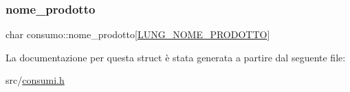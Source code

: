 \subsubsection{\texorpdfstring{nome\+\_\+prodotto}{nome\_prodotto}}
{\footnotesize\ttfamily char consumo\+::nome\+\_\+prodotto\mbox{[}\hyperlink{consumi_8h_aac906bc404d4143a882b5d18fe2e907e}{L\+U\+N\+G\+\_\+\+N\+O\+M\+E\+\_\+\+P\+R\+O\+D\+O\+T\+TO}\mbox{]}}



La documentazione per questa struct è stata generata a partire dal seguente file\+:\begin{DoxyCompactItemize}
\item 
src/\hyperlink{consumi_8h}{consumi.\+h}\end{DoxyCompactItemize}
